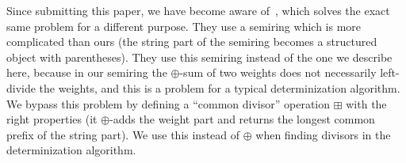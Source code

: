 \documentclass{article}
\begin{document}
Since submitting this paper, we have become aware of~\cite{shafran2011efficient},
which solves the exact same problem for a different purpose.  They use a semiring
which is more complicated than ours (the string part of the semiring becomes a
structured object with parentheses).  They use this semiring instead of the one
 we describe here, because in our semiring the $\oplus$-sum of two weights 
does not necessarily left-divide the weights, and this is a problem for 
a typical determinization algorithm.  We bypass
this problem by defining a ``common divisor'' operation $\boxplus$ with the
right properties (it $\oplus$-adds the weight part and returns the longest
common prefix of the string part).  We use this instead of
$\oplus$ when finding divisors in the determinization algorithm.


\end{document}
